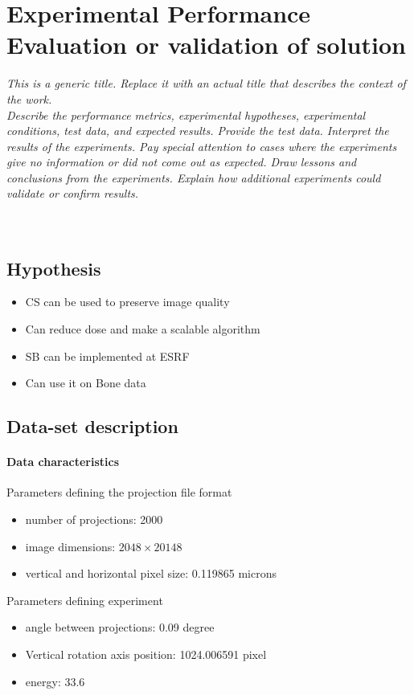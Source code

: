 \chapter{Experimental Performance Evaluation or validation of solution}
\textit{This is a generic title. Replace it with an actual title that describes the context of the work.\\
Describe the  performance metrics, experimental hypotheses,  experimental conditions, test data, and expected results.  Provide the test data.  Interpret the results of the experiments.  Pay special attention to cases where the experiments give no information or did not come out as expected.  Draw lessons and conclusions from the experiments. Explain how additional experiments could validate or confirm results.}\\
\\
\\
\section{Hypothesis}
\begin{itemize}
	\item CS can be used to preserve image quality
	\item Can reduce dose and make a scalable algorithm
	\item SB can be implemented at ESRF
	\item Can use it on Bone data
\end{itemize}

\section{Data-set description}

\subsubsection{Data characteristics}
Parameters defining the projection file format

\begin{itemize}
	\item number of projections: 2000
	\item image dimensions: $2048 \times 20148$
	\item vertical and horizontal pixel size: 0.119865 microns
\end{itemize}

Parameters defining experiment

\begin{itemize}
	\item angle between projections: 0.09 degree
	\item Vertical rotation axis position: 1024.006591 pixel
	\item energy: 33.6
\end{itemize}

